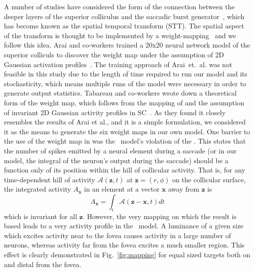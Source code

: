\documentclass{frontiersSCNS}
\begin{document}
A number of studies have considered the form of the connection between
the deeper layers of the superior colliculus and the saccadic burst
generator~\cite{van_gisbergen_experimental_1985,ottes_visuomotor_1986,waitzman_superior_1991,groh_converting_2001,arai_two-dimensional_1994,goossens_dynamic_2006,tabareau_geometry_2007,van_opstal_linear_2008,goossens_optimal_2012},
which has become known as the spatial temporal transform (STT).  The
spatial aspect of the transform is thought to be implemented by a
weight-mapping~\cite{tabareau_geometry_2007,arai_two-dimensional_1994} and we
follow this idea.
Arai and co-workers trained a 20x20 neural network model of the
superior colliculs to discover the weight map under the assumption of
2D Gaussian activation profiles~\cite{arai_two-dimensional_1994}.
%
The training approach of Arai~et.~al. was not feasible in this study
due to the length of time required to run our model and its
stochasticity, which means multiple runs of the model were necessary
in order to generate output statistics.
%
Tabareau and co-workers wrote down a theoretical form of the weight
map, which follows from the mapping of \cite{ottes_visuomotor_1986}
and the assumption of invariant 2D Gaussian activity profiles in
SC~\cite{tabareau_geometry_2007}. As they found it closely resembles the
results of Arai et al., and it is a simple formulation, we considered
it as the means to generate the six weight maps in our own model.
%
One barrier to the use of the weight map
in \cite{tabareau_geometry_2007} was the \ccg~model's violation of the
. This states that the number of spikes
emitted by a neural element during a saccade (or in our model, the
integral of the neuron's output during the saccade) should be a
function only of its position within the hill of collicular
activity. That is, for any time-dependent hill of activity
$\mathcal{A}(\mathbf{z},t)$ at $\mathbf{z} = (r,\phi)$ on the collicular
surface, the integrated activity  $A_{\mathbf{x}}$ in an element at a
vector $\mathbf{x}$ away from $\mathbf{z}$ is
\begin{equation}
A_{\mathbf{x}} = \int_t \mathcal{A}(\mathbf{z}-\mathbf{x}, t) dt
\end{equation}
which is invariant for all $\mathbf{z}$. However, the very mapping on
which the \cite{tabareau_geometry_2007} result is based leads to a
very  activity profile in the \ccg~model. A luminance of
a given size which excites activity near to the fovea causes activity
in a large number of neurons, whereas activity far from the fovea
excites a much smaller region. This effect is clearly demonstrated in
Fig.~\ref{fig:mapping} for equal sized targets both on and distal from
the fovea.
\end{document}
